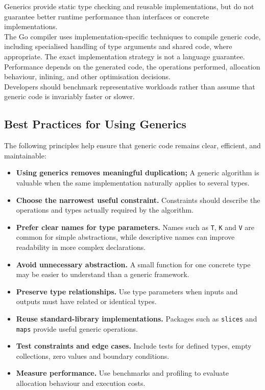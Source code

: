 Generics provide static type checking and reusable implementations, but do not guarantee better runtime performance than interfaces or concrete implementations.\\

The Go compiler uses implementation-specific techniques to compile generic code, including specialised handling of type arguments and shared code, where appropriate. The exact implementation strategy is not a language guarantee.\\

Performance depends on the generated code, the operations performed, allocation behaviour, inlining, and other optimisation decisions.\\

Developers should benchmark representative workloads rather than assume that generic code is invariably faster or slower.

\subsection{Best Practices for Using Generics}

The following principles help ensure that generic code remains clear, efficient, and maintainable:

\begin{itemize}
    \item \textbf{Using generics removes meaningful duplication;} A generic algorithm is valuable when the same implementation naturally applies to several types.
    \item \textbf{Choose the narrowest useful constraint.} Constraints should describe the operations and types actually required by the algorithm.
    \item \textbf{Prefer clear names for type parameters.} Names such as \texttt{T}, \texttt{K} and \texttt{V} are common for simple abstractions, while descriptive names can improve readability in more complex declarations.
    \item \textbf{Avoid unnecessary abstraction.} A small function for one concrete type may be easier to understand than a generic framework.
    \item \textbf{Preserve type relationships.} Use type parameters when inputs and outputs must have related or identical types.
    \item \textbf{Reuse standard-library implementations.} Packages such as \texttt{slices} and \texttt{maps} provide useful generic operations.
    \item \textbf{Test constraints and edge cases.} Include tests for defined types, empty collections, zero values and boundary conditions.
    \item \textbf{Measure performance.} Use benchmarks and profiling to evaluate allocation behaviour and execution costs.
\end{itemize}


